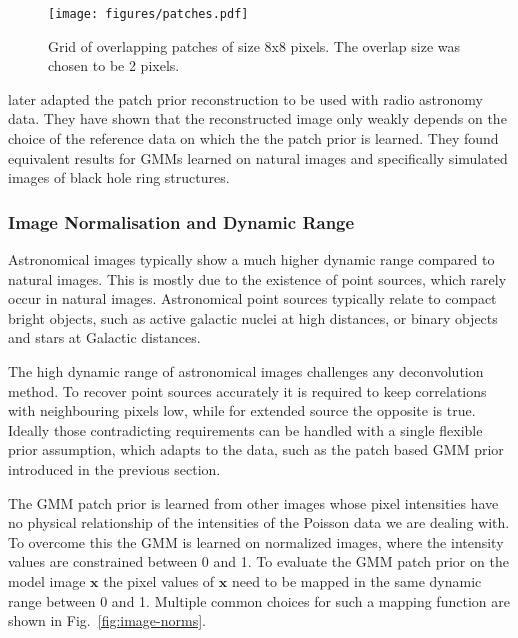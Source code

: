 \documentclass[twocolumn]{aastex631}
\begin{document}
    \begin{figure}[ht!]
        \begin{centering}
            \texttt{[image: figures/patches.pdf]}
            \caption{
                Grid of overlapping patches of size 8x8 pixels. The overlap size was chosen to be 2 pixels.
            }
            \label{fig:patches}
        \end{centering}
    \end{figure}

    \cite{Bouman2016} later adapted the patch prior reconstruction to be used
    with radio astronomy data.
    They have shown that the reconstructed image only weakly depends on the choice
    of the reference data on which the the patch prior is learned. They found
    equivalent results for GMMs learned on natural images and specifically
    simulated images of black hole ring structures.

    \subsubsection{Image Normalisation and Dynamic Range}
    Astronomical images typically show a much higher dynamic range compared to 
    natural images. This is mostly due to the existence of point sources, which
    rarely occur in natural images. Astronomical point sources typically relate
    to compact bright objects, such as active galactic nuclei at high distances,
    or binary objects and stars at Galactic distances.
    
    The high dynamic range of astronomical images challenges any deconvolution method.
    To recover point sources accurately it is required to keep correlations with
    neighbouring pixels low, while for extended source the opposite is true. Ideally
    those contradicting requirements can be handled with a single flexible prior assumption,
    which adapts to the data, such as the patch based GMM prior introduced in the previous
    section.
    
    The GMM patch prior is learned from other images whose pixel intensities
    have no physical relationship of the intensities of the Poisson data we are
    dealing with. To overcome this the GMM is learned on normalized images,
    where the intensity values are constrained between 0 and 1.
    To evaluate the GMM patch prior on the 
    model image $\mathbf{x}$ the pixel values of $\mathbf{x}$  need to be mapped 
    in the same dynamic range between 0 and 1. Multiple common choices for such a
    mapping function are shown in Fig.~\ref{fig:image-norms}. 
\end{document}
